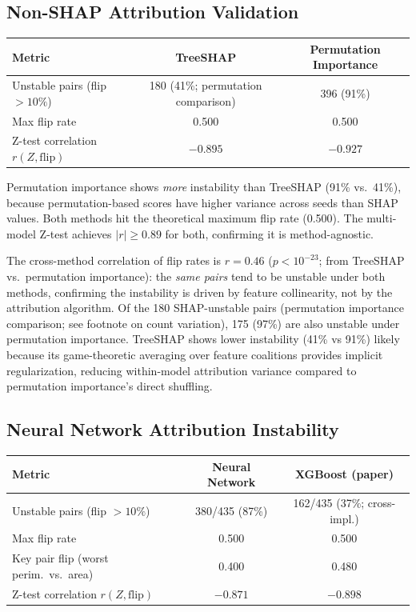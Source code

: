 \documentclass{article}
\begin{document}
\subsection{Non-SHAP Attribution Validation}

\begin{center}
\small
\begin{tabular}{@{}lcc@{}}
\toprule
Metric & TreeSHAP & Permutation Importance \\
\midrule
Unstable pairs (flip $>10\%$) & 180 (41\%; permutation comparison) & 396 (91\%) \\
Max flip rate & 0.500 & 0.500 \\
Z-test correlation $r(Z, \text{flip})$ & $-0.895$ & $-0.927$ \\
\bottomrule
\end{tabular}
\end{center}

Permutation importance shows \emph{more} instability than TreeSHAP (91\% vs.\ 41\%), because permutation-based scores have higher variance across seeds than SHAP values. Both methods hit the theoretical maximum flip rate (0.500). The multi-model Z-test achieves $|r| \geq 0.89$ for both, confirming it is method-agnostic.

The cross-method correlation of flip rates is $r = 0.46$ ($p < 10^{-23}$; from TreeSHAP vs.\ permutation importance): the \emph{same pairs} tend to be unstable under both methods, confirming the instability is driven by feature collinearity, not by the attribution algorithm. Of the 180 SHAP-unstable pairs (permutation importance comparison; see footnote on count variation), 175 (97\%) are also unstable under permutation importance. TreeSHAP shows lower instability (41\% vs 91\%) likely because its game-theoretic averaging over feature coalitions provides implicit regularization, reducing within-model attribution variance compared to permutation importance's direct shuffling.

\subsection{Neural Network Attribution Instability}

\begin{center}
\small
\begin{tabular}{@{}lcc@{}}
\toprule
Metric & Neural Network & XGBoost (paper) \\
\midrule
Unstable pairs (flip $> 10\%$) & 380/435 (87\%) & 162/435 (37\%; cross-impl.) \\
Max flip rate & 0.500 & 0.500 \\
Key pair flip (worst perim.\ vs.\ area) & 0.400 & 0.480 \\
Z-test correlation $r(Z, \text{flip})$ & $-0.871$ & $-0.898$ \\
\bottomrule
\end{tabular}
\end{center}
\end{document}
